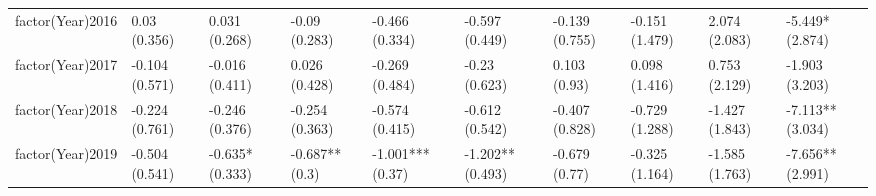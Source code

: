 \begin{table}[ht]
\begin{tabular}{llllllllll}
  factor(Year)2016 & 0.03 (0.356) & 0.031 (0.268) & -0.09 (0.283) & -0.466 (0.334) & -0.597 (0.449) & -0.139 (0.755) & -0.151 (1.479) & 2.074 (2.083) & -5.449* (2.874) \\ 
  factor(Year)2017 & -0.104 (0.571) & -0.016 (0.411) & 0.026 (0.428) & -0.269 (0.484) & -0.23 (0.623) & 0.103 (0.93) & 0.098 (1.416) & 0.753 (2.129) & -1.903 (3.203) \\ 
  factor(Year)2018 & -0.224 (0.761) & -0.246 (0.376) & -0.254 (0.363) & -0.574 (0.415) & -0.612 (0.542) & -0.407 (0.828) & -0.729 (1.288) & -1.427 (1.843) & -7.113** (3.034) \\ 
  factor(Year)2019 & -0.504 (0.541) & -0.635* (0.333) & -0.687** (0.3) & -1.001*** (0.37) & -1.202** (0.493) & -0.679 (0.77) & -0.325 (1.164) & -1.585 (1.763) & -7.656** (2.991) \\ 
   \bottomrule
\end{tabular}
\endgroup
\end{table}
